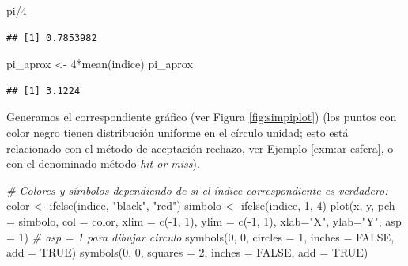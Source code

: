 \documentclass[
]{book}
\newenvironment{Shaded}{\begin{snugshade}}{\end{snugshade}}
\newcommand{\AttributeTok}[1]{\textcolor[rgb]{0.77,0.63,0.00}{#1}}
\newcommand{\CommentTok}[1]{\textcolor[rgb]{0.56,0.35,0.01}{\textit{#1}}}
\newcommand{\ConstantTok}[1]{\textcolor[rgb]{0.00,0.00,0.00}{#1}}
\newcommand{\DecValTok}[1]{\textcolor[rgb]{0.00,0.00,0.81}{#1}}
\newcommand{\FunctionTok}[1]{\textcolor[rgb]{0.00,0.00,0.00}{#1}}
\newcommand{\NormalTok}[1]{#1}
\newcommand{\OtherTok}[1]{\textcolor[rgb]{0.56,0.35,0.01}{#1}}
\newcommand{\SpecialCharTok}[1]{\textcolor[rgb]{0.00,0.00,0.00}{#1}}
\newcommand{\StringTok}[1]{\textcolor[rgb]{0.31,0.60,0.02}{#1}}
\theoremstyle{break}
\theoremstyle{nonumberplain}
\begin{document}
\begin{Shaded}
\begin{Highlighting}[]
\NormalTok{pi}\SpecialCharTok{/}\DecValTok{4}
\end{Highlighting}
\end{Shaded}

\begin{verbatim}
## [1] 0.7853982
\end{verbatim}

\begin{Shaded}
\begin{Highlighting}[]
\NormalTok{pi\_aprox }\OtherTok{\textless{}{-}} \DecValTok{4}\SpecialCharTok{*}\FunctionTok{mean}\NormalTok{(indice)}
\NormalTok{pi\_aprox}
\end{Highlighting}
\end{Shaded}

\begin{verbatim}
## [1] 3.1224
\end{verbatim}

Generamos el correspondiente gráfico (ver Figura \ref{fig:simpiplot}) (los puntos con color negro tienen distribución uniforme en el círculo unidad; esto está relacionado con el método de aceptación-rechazo, ver Ejemplo \ref{exm:ar-esfera}, o con el denominado método \emph{hit-or-miss}).

\begin{Shaded}
\begin{Highlighting}[]
\CommentTok{\# Colores y símbolos dependiendo de si el índice correspondiente es verdadero:}
\NormalTok{color }\OtherTok{\textless{}{-}} \FunctionTok{ifelse}\NormalTok{(indice, }\StringTok{"black"}\NormalTok{, }\StringTok{"red"}\NormalTok{) }
\NormalTok{simbolo }\OtherTok{\textless{}{-}} \FunctionTok{ifelse}\NormalTok{(indice, }\DecValTok{1}\NormalTok{, }\DecValTok{4}\NormalTok{)}
\FunctionTok{plot}\NormalTok{(x, y, }\AttributeTok{pch =}\NormalTok{ simbolo, }\AttributeTok{col =}\NormalTok{ color, }
     \AttributeTok{xlim =} \FunctionTok{c}\NormalTok{(}\SpecialCharTok{{-}}\DecValTok{1}\NormalTok{, }\DecValTok{1}\NormalTok{), }\AttributeTok{ylim =} \FunctionTok{c}\NormalTok{(}\SpecialCharTok{{-}}\DecValTok{1}\NormalTok{, }\DecValTok{1}\NormalTok{), }\AttributeTok{xlab=}\StringTok{"X"}\NormalTok{, }\AttributeTok{ylab=}\StringTok{"Y"}\NormalTok{, }\AttributeTok{asp =} \DecValTok{1}\NormalTok{) }
     \CommentTok{\# asp = 1 para dibujar circulo}
\FunctionTok{symbols}\NormalTok{(}\DecValTok{0}\NormalTok{, }\DecValTok{0}\NormalTok{, }\AttributeTok{circles =} \DecValTok{1}\NormalTok{, }\AttributeTok{inches =} \ConstantTok{FALSE}\NormalTok{, }\AttributeTok{add =} \ConstantTok{TRUE}\NormalTok{)}
\FunctionTok{symbols}\NormalTok{(}\DecValTok{0}\NormalTok{, }\DecValTok{0}\NormalTok{, }\AttributeTok{squares =} \DecValTok{2}\NormalTok{, }\AttributeTok{inches =} \ConstantTok{FALSE}\NormalTok{, }\AttributeTok{add =} \ConstantTok{TRUE}\NormalTok{)}
\end{Highlighting}
\end{Shaded}
\end{document}
